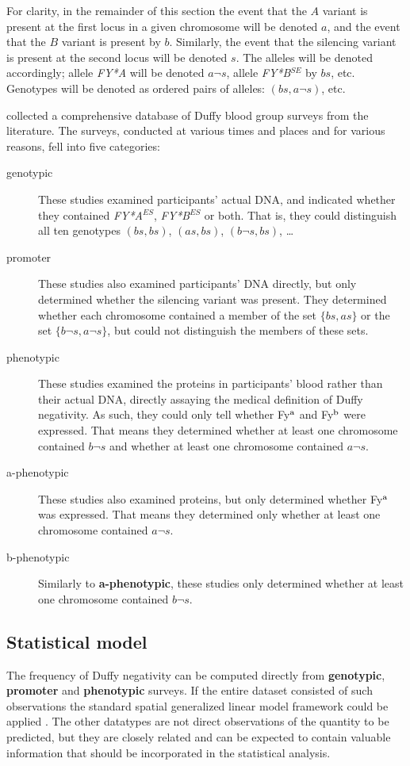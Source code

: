 \documentclass[article]{jss}
\begin{document}
For clarity, in the remainder of this section the event that the $A$ variant is present at the first locus in a given chromosome will be denoted $a$, and the event that the $B$ variant is present by $b$. Similarly, the event that the silencing variant is present at the second locus will be denoted $s$. The alleles will be denoted accordingly; allele \emph{FY*A} will be denoted $a\neg s$, allele \emph{FY*B}$^{SE}$ by $bs$, etc. Genotypes will be denoted as ordered pairs of alleles: $(bs,a \neg s)$, etc.

\cite{Howes} collected a comprehensive database of Duffy blood group surveys from the literature. The surveys, conducted at various times and places and for various reasons, fell into five categories:
\begin{description}
    \item[genotypic] These studies examined participants' actual DNA, and indicated whether they contained \emph{FY*A}$^{ES}$, \emph{FY*B}$^{ES}$ or both. That is, they could distinguish all ten genotypes $(bs,bs)$, $(as,bs)$, $(b\neg s,bs)$, \ldots
    \item[promoter] These studies also examined participants' DNA directly, but only determined whether the silencing variant was present. They determined whether each chromosome contained a member of the set $\{bs,as\}$ or the set $\{b\neg s, a\neg s\}$, but could not distinguish the members of these sets.
    \item[phenotypic] These studies examined the proteins in participants' blood rather than their actual DNA, directly assaying the medical definition of Duffy negativity. As such, they could only tell whether Fy$^\textup{a}$ and Fy$^\textup{b}$ were expressed. That means they determined whether at least one chromosome contained $b\neg s$ and whether at least one chromosome contained $a\neg s$.
    \item[a-phenotypic] These studies also examined proteins, but only determined whether Fy$^\textup{a}$ was expressed. That means they determined only whether at least one chromosome contained $a\neg s$.
    \item[b-phenotypic] Similarly to \textbf{a-phenotypic}, these studies only determined whether at least one chromosome contained $b\neg s$.
\end{description}

\subsection{Statistical model}
The frequency of Duffy negativity can be computed directly from \textbf{genotypic}, \textbf{promoter} and \textbf{phenotypic} surveys. If the entire dataset consisted of such observations the standard spatial generalized linear model framework could be applied \citep{diggle}. The other datatypes are not direct observations of the quantity to be predicted, but they are closely related and can be expected to contain valuable information that should be incorporated in the statistical analysis.
\end{document}
